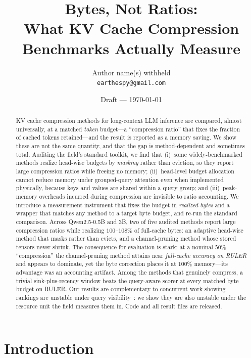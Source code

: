\documentclass[11pt]{article}
\title{Bytes, Not Ratios:\\ What KV Cache Compression Benchmarks Actually Measure}
\author{%
  Author name(s) withheld\\
  \texttt{earthespy@gmail.com}%
}
\date{Draft --- \today}
\begin{document}
\maketitle

\begin{abstract}
KV cache compression methods for long-context LLM inference are compared, almost universally, at a
matched \emph{token} budget---a ``compression ratio'' that fixes the fraction of cached tokens
retained---and the result is reported as a memory saving. We show these are not the same quantity,
and that the gap is method-dependent and sometimes total. Auditing the field's standard toolkit, we
find that (i)~some widely-benchmarked methods realize head-wise budgets by \emph{masking} rather than
eviction, so they report large compression ratios while freeing no memory; (ii)~head-level budget
allocation cannot reduce memory under grouped-query attention even when implemented physically,
because keys and values are shared within a query group; and (iii)~peak-memory overheads incurred
during compression are invisible to ratio accounting. We introduce a measurement instrument that
fixes the budget in \emph{realized bytes} and a wrapper that matches any method to a target byte
budget, and re-run the standard comparison. Across Qwen2.5-0.5B and 3B, two of five audited methods
report large compression ratios while realizing $100$--$108\%$ of full-cache bytes: an adaptive
head-wise method that masks rather than evicts, and a channel-pruning method whose stored tensors
never shrink. The consequence for evaluation is stark: at a nominal $50\%$ ``compression'' the
channel-pruning method attains near \emph{full-cache accuracy on RULER} and appears to dominate, yet
the byte correction places it at $100\%$ memory---its advantage was an accounting artifact. Among the
methods that genuinely compress, a trivial sink-plus-recency window beats the query-aware scorer at
every matched byte budget on RULER.
Our results are complementary to concurrent work showing rankings are unstable under query
visibility~\citep{luo2026queryvisibility}: we show they are also unstable under the resource unit the
field measures them in. Code and all result files are released.
\end{abstract}

\section{Introduction}
\label{sec:intro}
\end{document}
